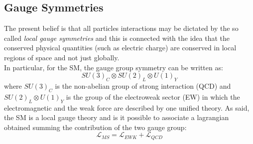 \subsection{Gauge Symmetries}
\label{cap1:gaugeSymm}
The present belief is that all particles interactions may be dictated by the so called \textit{local gauge symmetries} and this is connected with the idea that  the conserved physical quantities (such as electric charge) are conserved in local regions of space and not just globally\cite{HalzenMartin}. \\
In particular, for the SM, the gauge group symmetry can be written as:
\[
SU(3)_{C}\otimes SU(2)_{L}\otimes U(1)_{Y}
\label{gaugeMS}
\]
where $SU(3)_{C}$ is the non-abelian group of strong interaction (QCD) and $SU(2)_{L}\otimes U(1)_{Y}$ is the group of the electroweak sector (EW) in which the electromagnetic and the weak force are described by one unified theory. As said, the SM is a local gauge theory and is it possible to associate a lagrangian obtained summing the contribution of the two gauge group:
\begin{equation}
\mathcal{L}_{MS} = \mathcal{L}_{EWK} + \mathcal{L}_{QCD}
\label{Lms}
\end{equation}

